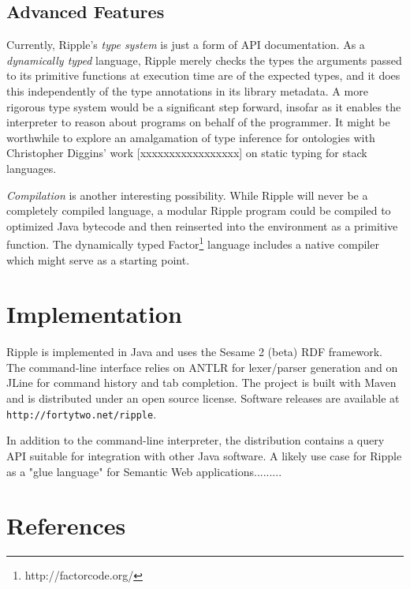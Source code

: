 \documentclass[runningheads]{llncs}
\begin{document}
\subsection{Advanced Features}
Currently, Ripple's \textit{type system} is just a form of API documentation.  As a \textit{dynamically typed} language, Ripple merely checks the types the arguments passed to its primitive functions at execution time are of the expected types, and it does this independently of the type annotations in its library metadata.  A more rigorous type system would be a significant step forward, insofar as it enables the interpreter to reason about programs on behalf of the programmer.  It might be worthwhile to explore an amalgamation of type inference for ontologies with Christopher Diggins' work [xxxxxxxxxxxxxxxxx] on static typing for stack languages.

\textit{Compilation} is another interesting possibility.  While Ripple will never be a completely compiled language, a modular Ripple program could be compiled to optimized Java bytecode and then reinserted into the environment as a primitive function.  The dynamically typed Factor\footnote{http://factorcode.org/} language includes a native compiler which might serve as a starting point.


\section{Implementation}
Ripple is implemented in Java and uses the Sesame 2 (beta) RDF framework.  The command-line interface relies on ANTLR for lexer/parser generation and on JLine for command history and tab completion.  The project is built with Maven and is distributed under an open source license.  Software releases are available at \texttt{http://fortytwo.net/ripple}.

In addition to the command-line interpreter, the distribution contains a query API suitable for integration with other Java software.  A likely use case for Ripple as a "glue language" for Semantic Web applications.........



\section{References}
\end{document}
